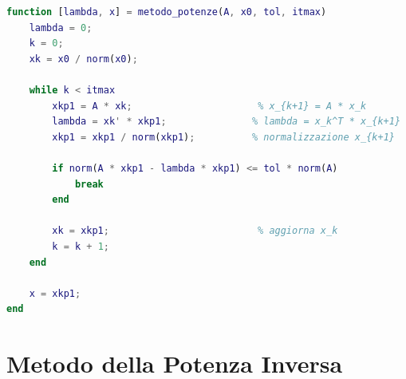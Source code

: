 \documentclass[12pt,a4paper]{article}
\begin{document}
\vspace{1em}
\begin{lstlisting}[language=Matlab]
function [lambda, x] = metodo_potenze(A, x0, tol, itmax)
    lambda = 0;
    k = 0;
    xk = x0 / norm(x0);

    while k < itmax
        xkp1 = A * xk;                      % x_{k+1} = A * x_k
        lambda = xk' * xkp1;               % lambda = x_k^T * x_{k+1}
        xkp1 = xkp1 / norm(xkp1);          % normalizzazione x_{k+1}
        
        if norm(A * xkp1 - lambda * xkp1) <= tol * norm(A)
            break
        end

        xk = xkp1;                          % aggiorna x_k
        k = k + 1;
    end

    x = xkp1;
end
\end{lstlisting}
\newpage


\section*{Metodo della Potenza Inversa}

\begin{flushleft}
\end{flushleft}
\end{document}
